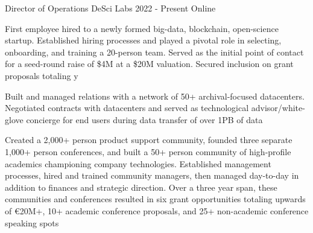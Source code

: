 
\begin{cventries}

  \cventry
    {Director of Operations} %
    {DeSci Labs} %
    {2022 - Present} %
    {Online} %
    {
      \begin{cvitems} %
        \item {First employee hired to a newly formed big-data, blockchain, open-science startup. Established hiring processes and played a pivotal role in selecting, onboarding, and training a 20-person team. Served as the initial point of contact for a seed-round raise of \$4M at a \$20M valuation. Secured inclusion on grant proposals totaling y}
        \item {Built and managed relations with a network of 50+ archival-focused datacenters. Negotiated contracts with datacenters and served as technological advisor/white-glove concierge for end users during data transfer of over 1PB of data}  
        \item {Created a 2,000+ person product support community, founded three separate 1,000+ person conferences, and built a 50+ person community of high-profile academics championing company technologies. Established management processes, hired and trained community managers, then managed day-to-day in addition to finances and strategic direction. Over a three year span, these communities and conferences resulted in six grant opportunities totaling upwards of €20M+, 10+ academic conference proposals, and 25+ non-academic conference speaking spots}
      \end{cvitems}
    }


\end{cventries}
